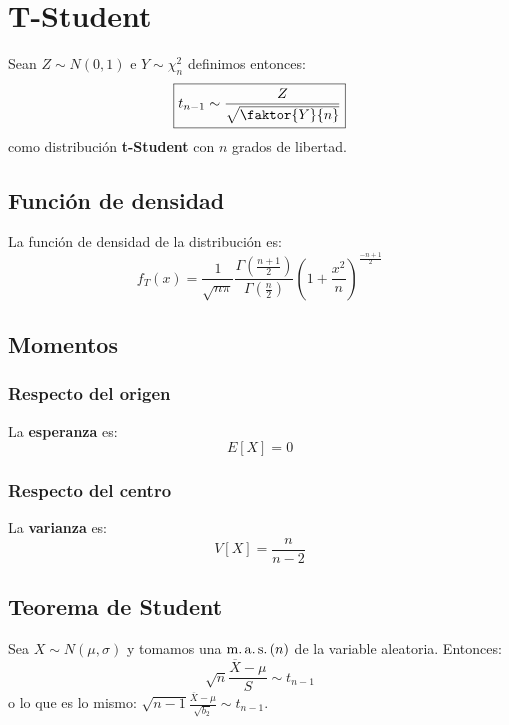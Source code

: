 \section{T-Student}
\label{sec:t_student}
Sean $Z \sim N\left( 0, 1 \right)$ e $Y \sim \chi^2_n$ definimos entonces:
\[
\boxed{t_{n-1} \sim \frac{Z}{\sqrt{\faktor{Y}{n}}}}
\]
como distribución \textbf{t-Student} con $n$ grados de libertad.

\subsection{Función de densidad}
La función de densidad de la distribución es:
\[
f_T \left( x \right) = \frac{1}{\sqrt{n \pi}}\frac{\Gamma\left( \frac{n + 1}{2} \right)}{\Gamma\left( \frac{n}{2} \right)} \left( 1 + \frac{x^2}{n} \right)^{\frac{-n+1}{2}}
\]

\subsection{Momentos}

\subsubsection*{Respecto del origen}
La \textbf{esperanza} es: 
\[
    E\left[ X \right] = 0
\]
\subsubsection*{Respecto del centro}
La \textbf{varianza} es:
\[
    V\left[ X \right] = \frac{n}{n-2}
\]

\subsection{Teorema de Student}
Sea $X \sim N\left( \mu, \sigma \right)$ y tomamos una $\operatorname{m.a.s.}\left( n \right)$ de la variable aleatoria. 
Entonces:
\[
\boxed{\sqrt{n}\frac{\overline{X} - \mu}{S} \sim t_{n-1}}
\]
o lo que es lo mismo: $\sqrt{n-1} \frac{\overline{X} - \mu}{\sqrt{b_2}} \sim t_{n-1}$.
